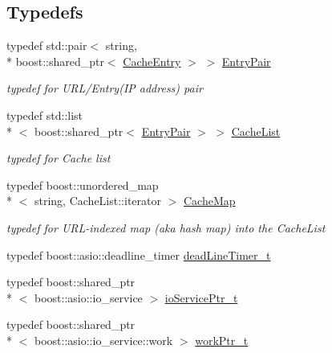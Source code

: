 \subsection*{Typedefs}
\begin{DoxyCompactItemize}
\item 
typedef std\-::pair$<$ string, \\*
boost\-::shared\-\_\-ptr$<$ \hyperlink{structxtd_1_1network_1_1utils_1_1CacheEntry}{Cache\-Entry} $>$ $>$ \hyperlink{namespacextd_1_1network_1_1utils_a1118a93e3ee4c3aba74b90600794145b}{Entry\-Pair}
\begin{DoxyCompactList}\small\item\em typedef for U\-R\-L/\-Entry(I\-P address) pair \end{DoxyCompactList}\item 
typedef std\-::list\\*
$<$ boost\-::shared\-\_\-ptr$<$ \hyperlink{namespacextd_1_1network_1_1utils_a1118a93e3ee4c3aba74b90600794145b}{Entry\-Pair} $>$ $>$ \hyperlink{namespacextd_1_1network_1_1utils_a6eef494cdc6ca2b10bf4f36f6fa110ee}{Cache\-List}
\begin{DoxyCompactList}\small\item\em typedef for Cache list \end{DoxyCompactList}\item 
typedef boost\-::unordered\-\_\-map\\*
$<$ string, Cache\-List\-::iterator $>$ \hyperlink{namespacextd_1_1network_1_1utils_aa648e4975dce81f2fd0a9999f684781d}{Cache\-Map}
\begin{DoxyCompactList}\small\item\em typedef for U\-R\-L-\/indexed map (aka hash map) into the Cache\-List \end{DoxyCompactList}\item 
typedef boost\-::asio\-::deadline\-\_\-timer \hyperlink{namespacextd_1_1network_1_1utils_af551b4a44731a154a57b9447dac595cd}{dead\-Line\-Timer\-\_\-t}
\item 
typedef boost\-::shared\-\_\-ptr\\*
$<$ boost\-::asio\-::io\-\_\-service $>$ \hyperlink{namespacextd_1_1network_1_1utils_a67dfba91438896976d636d5aea36c848}{io\-Service\-Ptr\-\_\-t}
\item 
typedef boost\-::shared\-\_\-ptr\\*
$<$ boost\-::asio\-::io\-\_\-service\-::work $>$ \hyperlink{namespacextd_1_1network_1_1utils_a9e0bae7b0da2b42ca8930a927f3a7c4d}{work\-Ptr\-\_\-t}
\item 

\end{DoxyCompactItemize}
